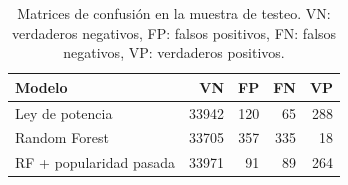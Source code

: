 \begin{table}[htbp]
\caption{Matrices de confusión en la muestra de testeo. VN: verdaderos negativos, FP: falsos positivos, FN: falsos negativos, VP: verdaderos positivos.}
\label{tab:matrices}
\begin{tabular}{lrrrr}
\toprule
Modelo & VN & FP & FN & VP \\
\midrule
Ley de potencia & 33942 & 120 & 65 & 288 \\
Random Forest & 33705 & 357 & 335 & 18 \\
RF + popularidad pasada & 33971 & 91 & 89 & 264 \\
\bottomrule
\end{tabular}
\end{table}
